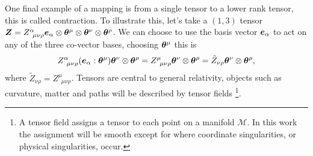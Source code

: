 One final example of a mapping is from a single tensor to a lower rank tensor, this is called contraction. To illustrate this, let's take a $(1,3)$ tensor $\boldsymbol{Z} = Z^\alpha_{\,\,\,\mu\nu\rho} \boldsymbol{e}_\alpha \otimes\boldsymbol{\theta}^\mu\otimes\boldsymbol{\theta}^\nu\otimes\boldsymbol{\theta}^\rho$. We can choose to use the basis vector $\boldsymbol{e}_\alpha$ to act on any of the three co-vector bases, choosing $\boldsymbol{\theta}^\mu$ this is
\begin{equation}
Z^\alpha_{\,\,\,\mu\nu\rho} (\boldsymbol{e}_\alpha : \boldsymbol{\theta}^\mu)\boldsymbol{\theta}^\nu\otimes\boldsymbol{\theta}^\rho = Z^\mu_{\,\,\,\mu\nu\rho}\boldsymbol{\theta}^\nu\otimes\boldsymbol{\theta}^\rho = \tilde{Z}_{\nu\rho}\boldsymbol{\theta}^\nu\otimes\boldsymbol{\theta}^\rho,
\end{equation}
where $\tilde{Z}_{\nu\rho} = Z^\mu_{\,\,\,\mu\nu\rho}$. Tensors are central to general
relativity, objects such as curvature, matter and paths will be described by tensor fields
\footnote{A tensor field assigns a tensor to each point on a manifold $\mathcal{M}$. \color{orchid}
In this work the assignment will be smooth except for where coordinate singularities, or physical singularities, occur.
}.





